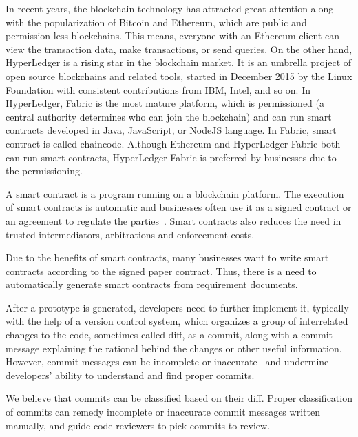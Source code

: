 
In recent years, the blockchain technology has attracted great attention along with the popularization of Bitcoin and Ethereum,
which are public and permission-less blockchains.
This means, everyone with an Ethereum client can view the transaction data, make transactions, or send queries.
On the other hand, HyperLedger is a rising star in the blockchain market. It is an umbrella project of open source blockchains and related tools, started in December 2015 by the Linux Foundation with consistent contributions from IBM, Intel, and so on.
In HyperLedger, Fabric is the most mature platform, which is permissioned (a central authority determines who can join the blockchain) and can run smart contracts developed in Java, JavaScript, or NodeJS language. In Fabric, smart contract is called chaincode. Although Ethereum and HyperLedger Fabric both can run smart contracts, HyperLedger Fabric is preferred by businesses due to the permissioning.

A smart contract is a program running on a blockchain platform.
The execution of smart contracts is automatic and businesses often use it as a signed contract or an agreement to regulate the parties~\cite{savelyev2017contract}.
Smart contracts also reduces the need in trusted intermediators, arbitrations and enforcement costs.

Due to the benefits of smart contracts, many businesses want to write smart contracts according to the signed paper contract. Thus, there is a need to automatically generate smart contracts from requirement documents.


After a prototype is generated, developers need to further implement it, typically with the help of a version control system,
which organizes a group of interrelated changes to the code, sometimes called diff, as a commit, along with a commit message explaining the rational behind the changes or other useful information.
However, commit messages can be incomplete or inaccurate~\cite{buse2010automatically} and undermine developers' ability to understand and find proper commits.

We believe that commits can be classified based on their diff.
Proper classification of commits can remedy incomplete or inaccurate commit messages written manually, and
guide code reviewers to pick commits to review.



